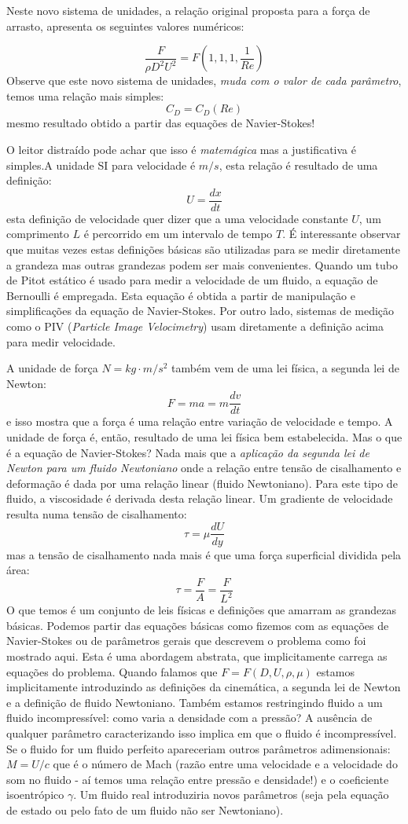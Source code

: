 Neste novo sistema de unidades, a relação original proposta para a força de arrasto, apresenta os seguintes valores numéricos:

\[
\frac{F}{\rho D^2 U^2} = F\left(1,1,1, \frac{1}{Re} \right)
\]
Observe que este novo sistema de unidades, \emph{ muda com o valor de cada parâmetro}, temos uma relação mais simples:
\[
C_D = C_D(Re)
\]
mesmo resultado obtido a partir das equações de Navier-Stokes!

O leitor distraído pode achar que isso é \emph{matemágica} mas a justificativa é simples.A unidade SI para velocidade é $m/s$, esta relação é resultado de uma definição:
\[
U = \frac{dx}{dt}
\]
esta definição de velocidade quer dizer que a uma velocidade constante $U$, um comprimento $L$ é percorrido em um intervalo de tempo $T$. É interessante observar que muitas vezes estas definições básicas são utilizadas para se medir diretamente a grandeza mas outras grandezas podem ser mais convenientes. Quando um tubo de Pitot estático é usado para medir a velocidade de um fluido, a equação de Bernoulli é empregada. Esta equação é obtida a partir de manipulação e simplificações da equação de Navier-Stokes. Por outro lado, sistemas de medição como o PIV (\emph{Particle Image Velocimetry}) usam diretamente a definição acima para medir velocidade.

A unidade de força $N = kg\cdot m/s^2$ também vem de uma lei física, a segunda lei de Newton:
\[
F = ma = m\frac{dv}{dt}
\]
e isso mostra que a força é uma relação entre variação de velocidade e tempo. A unidade de força é, então, resultado de uma lei física bem estabelecida. Mas o que é a equação de Navier-Stokes? Nada mais que a \emph{aplicação da segunda lei de Newton para um fluido  Newtoniano} onde a relação entre tensão de cisalhamento e deformação é dada por uma relação linear (fluido Newtoniano). Para este tipo de fluido, a viscosidade é derivada desta relação linear. Um gradiente de velocidade resulta numa tensão de cisalhamento:
\[
\tau = \mu \frac{dU}{dy}
\]
mas a tensão de cisalhamento nada mais é que uma força superficial dividida pela área:
\[
\tau = \frac{F}{A} = \frac{F}{L^2}
\]
O que temos é um conjunto de leis físicas e definições que amarram as grandezas básicas. Podemos partir das equações básicas como fizemos com as equações de Navier-Stokes ou de parâmetros gerais que descrevem o problema como foi mostrado aqui. Esta é uma abordagem abstrata, que implicitamente carrega as equações do problema. Quando falamos que $F = F(D, U, \rho, \mu)$ estamos implicitamente introduzindo as definições da cinemática, a segunda lei de Newton e a definição de fluido Newtoniano. Também estamos restringindo fluido a um fluido incompressível: como varia a densidade com a pressão? A ausência de qualquer parâmetro caracterizando isso implica em que o fluido é incompressível. Se o fluido for um fluido perfeito apareceriam outros parâmetros adimensionais: $M = U/c$ que é o número de Mach (razão entre uma velocidade e a velocidade do som no fluido - aí temos uma relação entre pressão e densidade!) e o coeficiente isoentrópico $\gamma$. Um fluido real introduziria novos parâmetros (seja pela equação de estado ou pelo fato de um fluido não ser Newtoniano). 

